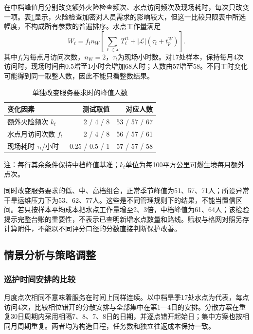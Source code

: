 \documentclass[UTF8,fontset=fandol,12pt,a4paper]{ctexart}
\begin{document}
在中档峰值月分别改变额外火险检查频次、水点访问频次及现场耗时，每次只改变一项。表\ref{tab:standards}显示，火险检查加密对人员需求的影响较大，但这一比较只限表中所选幅度，不构成所有参数的普遍排序。水点工作量满足
\begin{equation}
W_t=f_tn_W\left[\sum_{\ell\in\mathcal L}T_\ell^{\mathrm{rt}}+
|\mathcal L|(\tau_t+t_p^W)\right].
\label{eq:water}
\end{equation}
其中\(f_t\)为每点月访问次数，\(n_W=2\)，\(\tau_t\)为现场小时数。对17处样本，保持每月4次访问时，现场时间由0.5增至1小时会增加68人时；人数由57增至58。不同工时变化可能得到同一取整人数，因此不能只看整数结果。

\begin{table}[htbp]
\centering\small
\caption{单独改变服务要求时的峰值人数}
\label{tab:standards}
\begin{tabularx}{\linewidth}{Xrr}
\toprule
变化因素 & 测试取值 & 对应人数 \\
\midrule
额外火险频次 \(k_t\) & 2 / 4 / 8 & 53 / 57 / 67 \\
水点月访问次数 \(f_t\) & 2 / 4 / 8 & 56 / 57 / 61 \\
现场耗时 \(\tau_t\)/小时 & 0.25 / 0.5 / 1 & 57 / 57 / 58 \\
\bottomrule
\end{tabularx}
\par\smallskip\begin{minipage}{\linewidth}\footnotesize 注：每行其余条件保持中档峰值基准；\(k_t\)单位为每100平方公里可燃生境每月额外点次。\end{minipage}
\end{table}

同时改变服务要求的低、中、高档组合，正常季节峰值为51、57、71人；所设异常干旱运维压力下为53、62、77人。这些是不同管理规则下的结果，不能当置信区间。若只按样本平均成本把水点工作量增至2、3倍，中档峰值为61、64人；该检验揭示完整台账的重要性，不表示已查明新增水点数量和路线。赋权与格网对照另存计算附件，不能以不同评分口径的分数直接判断保护改善。

\subsection{情景分析与策略调整}

\subsubsection{巡护时间安排的比较}

月度点次相同不意味着服务在时间上同样连续。以中档旱季17处水点为代表，每点访问4次，比较相位错开的分散安排与全部集中在第1—4日的安排。分散方案在重复30日周期内采用相隔7、8、7、8日的日期，并逐点错开起始日；集中方案也按相同月周期重复。两者均为构造日程，任务数和独立往返成本保持一致。
\end{document}
